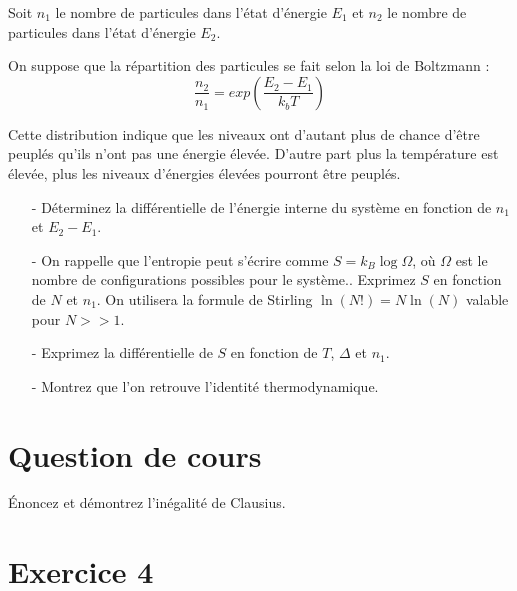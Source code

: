 \documentclass{report}
\begin{document}
Soit $n_{1}$ le nombre de particules dans l'état d'énergie $E_{1}$ et $n_{2}$ le nombre de particules dans l'état d'énergie $E_{2}$.

On suppose que la répartition des particules se fait selon la loi de Boltzmann :
\begin{equation}
\frac{n_{2}}{n_{1}}=exp\left( \frac{E_{2}-E_{1}}{k_{b}T}\right) 
\end{equation}

Cette distribution indique que les niveaux ont d'autant plus de chance d'être peuplés qu'ils n'ont pas une énergie élevée. D'autre part plus la température est élevée, plus les niveaux d'énergies élevées pourront être peuplés. 

\begin{itemize}
\item[-]Déterminez la différentielle de l'énergie interne du système en fonction de $n_{1}$ et $E_{2}-E_{1}$.
\item[-]On rappelle que l'entropie peut s'écrire comme $S=k_B\log\Omega$, où $\Omega$ est le nombre de configurations possibles pour le système.. Exprimez $S$ en fonction de $N$ et $n_1$. On utilisera la formule de Stirling $\ln (N!)=N \ln (N)$ valable pour $N>>1$.
\item[-] Exprimez la différentielle de $S$ en fonction de $T$, $\Delta$ et $n_1$.
\item[-] Montrez que l'on retrouve l'identité thermodynamique.
\end{itemize}

\newpage

\section*{Question de cours}
Énoncez et démontrez l’inégalité de Clausius.

\section*{Exercice 4}
\end{document}
